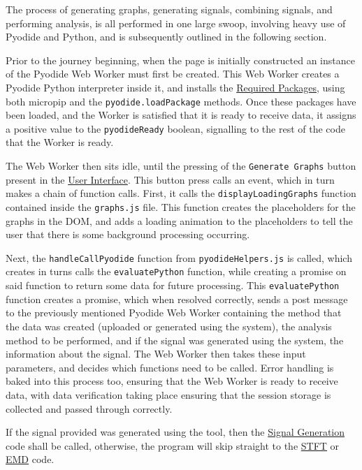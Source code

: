 The process of generating graphs, generating signals, combining signals, and performing analysis, is all performed in one large swoop, involving heavy use of Pyodide and Python,
and is subsequently outlined in the following section.

Prior to the journey beginning, when the page is initially constructed an instance of the Pyodide Web Worker must first be created. This Web Worker creates a Pyodide Python interpreter inside it, and installs the 
\hyperref[requiredpackages]{Required Packages}, using both micropip and the \verb|pyodide.loadPackage| methods. Once these packages have been loaded, and the Worker is satisfied that it is ready to receive data, it assigns a 
positive value to the \verb|pyodideReady| boolean, signalling to the rest of the code that the Worker is ready.

The Web Worker then sits idle, until the pressing of the \verb|Generate Graphs| button present in the \hyperref[frontendsection]{User Interface}. This button press calls an event, which in turn makes a chain of function calls.
First, it calls the \verb|displayLoadingGraphs| function contained inside the \verb|graphs.js| file. 
This function creates the placeholders for the graphs in the DOM, and adds a loading animation to the placeholders to tell the user that there is some background processing occurring.

Next, the \verb|handleCallPyodide| function from \verb|pyodideHelpers.js| is called, which creates in turns calls the \verb|evaluatePython| function, while creating a promise on said function to return some data for
future processing.
This \verb|evaluatePython| function creates a promise, which when resolved correctly, sends a post message to the previously mentioned Pyodide Web Worker containing the method that the data was created (uploaded or generated 
using the system), the analysis method to be performed, and if the signal was generated using the system, the information about the signal. The Web Worker then takes these input parameters, and decides which functions need to be called.
Error handling is baked into this process too, ensuring that the Web Worker is ready to receive data, with data verification taking place ensuring that the session storage is collected and passed through correctly.

If the signal provided was generated using the tool, then the \hyperref[signalgeneration]{Signal Generation} code shall be called, otherwise, the program will skip straight to the \hyperref[stftsection]{STFT} or \hyperref[emdsection]{EMD}
code.

